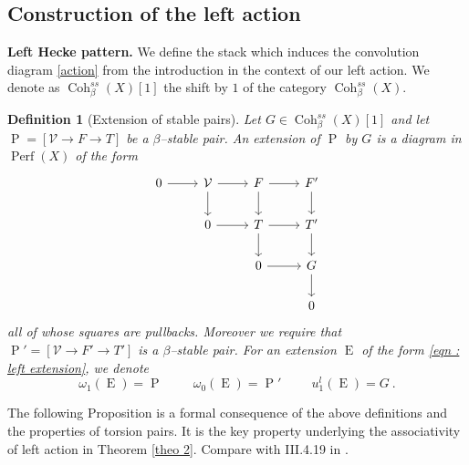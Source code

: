 \documentclass[11pt]{article}
\newtheorem{definition}{Definition}
\newcommand{\cohbetass}{\operatorname{Coh}^{ss}_{\beta}(X)}
\newcommand{\perf}{\operatorname{Perf}(X)}
\begin{document}
\subsection{Construction of the left action}\label{subsec : Construction of the left action}

\noindent\textbf{Left Hecke pattern. }We define the stack which induces the convolution diagram \eqref{action} from the introduction in the context of our left action. We denote as $\cohbetass[1]$ the shift by $1$ of the category $\cohbetass$.

\begin{definition}[Extension of stable pairs]\label{def : left extension}
    Let $G\in \cohbetass[1]$ and let $\operatorname{P} = [\mathcal{V}\rightarrow F \rightarrow T]$ be a $\beta$--stable pair. An extension of $\operatorname{P}$ by $G$ is a diagram in $\perf$ of the form
\begin{equation}\label{eqn : left extension}
    \begin{tikzcd}
0 \arrow[r]    & \mathcal{V}  \arrow[d] \arrow[r] & F \arrow[d] \arrow[r] & F' \arrow[d] \\ & 0 \arrow[r] & T \arrow[d] \arrow[r] & T' \arrow[d]\\ & & 0 \arrow[r] & G \arrow[d]\\ &&& 0
\end{tikzcd}
\end{equation}
all of whose squares are pullbacks. Moreover we require that $\operatorname{P}'=[\mathcal{V}\rightarrow F' \rightarrow T']$ is a $\beta$--stable pair. For an extension ${\operatorname{E}}$ of the form \eqref{eqn : left extension}, we denote
\begin{equation}\label{eqn : extensionprojection}
\omega_1({\operatorname{E}}) = \operatorname{P} \hspace{1cm} \omega_0({\operatorname{E}}) = \operatorname{P}' \hspace{1cm} u^l_1({\operatorname{E}}) = G\ .  
\end{equation}
\end{definition}

\noindent The following Proposition is a formal consequence of the above definitions and the properties of torsion pairs. It is the key property underlying the associativity of left action in Theorem \ref{theo 2}. Compare with III.4.19 in \cite{dps}. 
\end{document}
